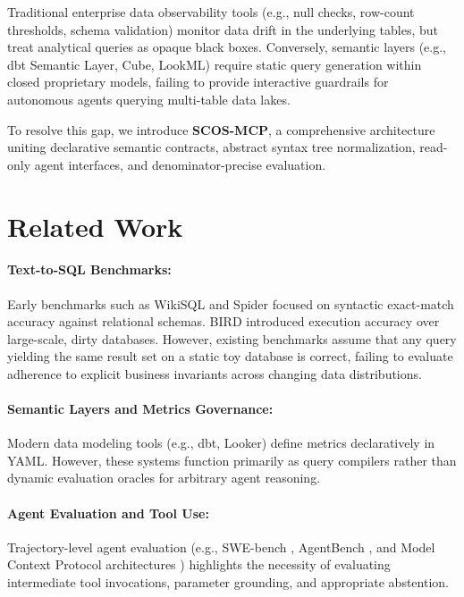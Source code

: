 \documentclass[11pt,a4paper]{article}
\begin{document}
Traditional enterprise data observability tools (e.g., null checks, row-count thresholds, schema validation) monitor data drift in the underlying tables, but treat analytical queries as opaque black boxes. Conversely, semantic layers (e.g., dbt Semantic Layer, Cube, LookML) require static query generation within closed proprietary models, failing to provide interactive guardrails for autonomous agents querying multi-table data lakes.

To resolve this gap, we introduce \textbf{SCOS-MCP}, a comprehensive architecture uniting declarative semantic contracts, abstract syntax tree normalization, read-only agent interfaces, and denominator-precise evaluation.

\section{Related Work}
\label{sec:related}

\paragraph{Text-to-SQL Benchmarks:} Early benchmarks such as WikiSQL \cite{zhong2017seq2sql} and Spider \cite{yu2018spider} focused on syntactic exact-match accuracy against relational schemas. BIRD \cite{li2023bird} introduced execution accuracy over large-scale, dirty databases. However, existing benchmarks assume that any query yielding the same result set on a static toy database is correct, failing to evaluate adherence to explicit business invariants across changing data distributions.

\paragraph{Semantic Layers and Metrics Governance:} Modern data modeling tools (e.g., dbt, Looker) define metrics declaratively in YAML. However, these systems function primarily as query compilers rather than dynamic evaluation oracles for arbitrary agent reasoning.

\paragraph{Agent Evaluation and Tool Use:} Trajectory-level agent evaluation (e.g., SWE-bench \cite{jimenez2023swebench}, AgentBench \cite{liu2023agentbench}, and Model Context Protocol architectures \cite{anthropic2024mcp}) highlights the necessity of evaluating intermediate tool invocations, parameter grounding, and appropriate abstention.
\end{document}
